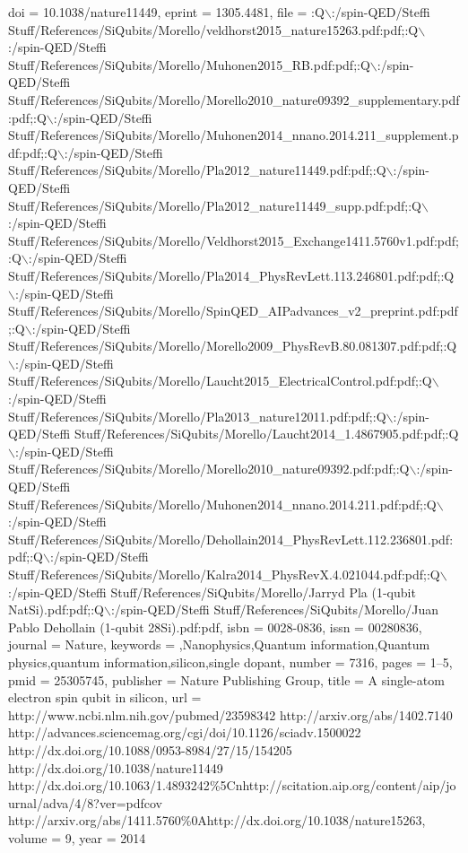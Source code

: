 {doi = {10.1038/nature11449},
eprint = {1305.4481},
file = {:Q$\backslash$:/spin-QED/Steffi Stuff/References/SiQubits/Morello/veldhorst2015{\_}nature15263.pdf:pdf;:Q$\backslash$:/spin-QED/Steffi Stuff/References/SiQubits/Morello/Muhonen2015{\_}RB.pdf:pdf;:Q$\backslash$:/spin-QED/Steffi Stuff/References/SiQubits/Morello/Morello2010{\_}nature09392{\_}supplementary.pdf:pdf;:Q$\backslash$:/spin-QED/Steffi Stuff/References/SiQubits/Morello/Muhonen2014{\_}nnano.2014.211{\_}supplement.pdf:pdf;:Q$\backslash$:/spin-QED/Steffi Stuff/References/SiQubits/Morello/Pla2012{\_}nature11449.pdf:pdf;:Q$\backslash$:/spin-QED/Steffi Stuff/References/SiQubits/Morello/Pla2012{\_}nature11449{\_}supp.pdf:pdf;:Q$\backslash$:/spin-QED/Steffi Stuff/References/SiQubits/Morello/Veldhorst2015{\_}Exchange1411.5760v1.pdf:pdf;:Q$\backslash$:/spin-QED/Steffi Stuff/References/SiQubits/Morello/Pla2014{\_}PhysRevLett.113.246801.pdf:pdf;:Q$\backslash$:/spin-QED/Steffi Stuff/References/SiQubits/Morello/SpinQED{\_}AIPadvances{\_}v2{\_}preprint.pdf:pdf;:Q$\backslash$:/spin-QED/Steffi Stuff/References/SiQubits/Morello/Morello2009{\_}PhysRevB.80.081307.pdf:pdf;:Q$\backslash$:/spin-QED/Steffi Stuff/References/SiQubits/Morello/Laucht2015{\_}ElectricalControl.pdf:pdf;:Q$\backslash$:/spin-QED/Steffi Stuff/References/SiQubits/Morello/Pla2013{\_}nature12011.pdf:pdf;:Q$\backslash$:/spin-QED/Steffi Stuff/References/SiQubits/Morello/Laucht2014{\_}1.4867905.pdf:pdf;:Q$\backslash$:/spin-QED/Steffi Stuff/References/SiQubits/Morello/Morello2010{\_}nature09392.pdf:pdf;:Q$\backslash$:/spin-QED/Steffi Stuff/References/SiQubits/Morello/Muhonen2014{\_}nnano.2014.211.pdf:pdf;:Q$\backslash$:/spin-QED/Steffi Stuff/References/SiQubits/Morello/Dehollain2014{\_}PhysRevLett.112.236801.pdf:pdf;:Q$\backslash$:/spin-QED/Steffi Stuff/References/SiQubits/Morello/Kalra2014{\_}PhysRevX.4.021044.pdf:pdf;:Q$\backslash$:/spin-QED/Steffi Stuff/References/SiQubits/Morello/Jarryd Pla (1-qubit NatSi).pdf:pdf;:Q$\backslash$:/spin-QED/Steffi Stuff/References/SiQubits/Morello/Juan Pablo Dehollain (1-qubit 28Si).pdf:pdf},
isbn = {0028-0836},
issn = {00280836},
journal = {Nature},
keywords = {,Nanophysics,Quantum information,Quantum physics,quantum information,silicon,single dopant},
number = {7316},
pages = {1--5},
pmid = {25305745},
publisher = {Nature Publishing Group},
title = {{A single-atom electron spin qubit in silicon}},
url = {http://www.ncbi.nlm.nih.gov/pubmed/23598342 http://arxiv.org/abs/1402.7140 http://advances.sciencemag.org/cgi/doi/10.1126/sciadv.1500022 http://dx.doi.org/10.1088/0953-8984/27/15/154205 http://dx.doi.org/10.1038/nature11449 http://dx.doi.org/10.1063/1.4893242{\%}5Cnhttp://scitation.aip.org/content/aip/journal/adva/4/8?ver=pdfcov http://arxiv.org/abs/1411.5760{\%}0Ahttp://dx.doi.org/10.1038/nature15263},
volume = {9},
year = {2014}
}
